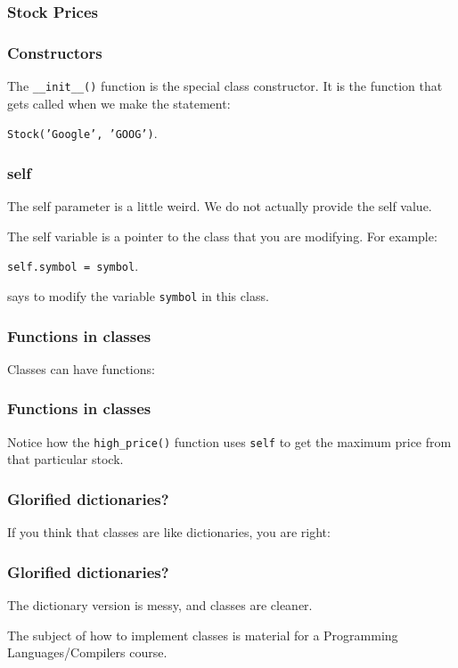 \documentclass{beamer}
\begin{document}
\begin{frame}
\frametitle{Stock Prices}


\end{frame}


\begin{frame}
\frametitle{Constructors}

The \texttt{\_\_init\_\_()} function is the special class constructor.  It is the function that gets called when we make the statement:

\begin{center}
\texttt{Stock('Google', 'GOOG')}.
\end{center}

\end{frame}

\begin{frame}
\frametitle{self}
The self parameter is a little weird.  We do not actually provide the self value.

\vspace{0.2in}

The self variable is a pointer to the class that you are modifying.  For example:

\begin{center}
\texttt{self.symbol = symbol}.
\end{center}

says to modify the variable \texttt{symbol} in this class.

\end{frame}

\begin{frame}
\frametitle{Functions in classes}
Classes can have functions:

\end{frame}


\begin{frame}
\frametitle{Functions in classes}
Notice how the \texttt{high\_price()} function uses \texttt{self} to get the maximum price from that particular stock.
\end{frame}


\begin{frame}
\frametitle{Glorified dictionaries?}
If you think that classes are like dictionaries, you are right:
\end{frame}

\begin{frame}
\frametitle{Glorified dictionaries?}
The dictionary version is messy, and classes are cleaner.

\vspace{0.2in}

The subject of how to implement classes is material for a Programming Languages/Compilers course.
\end{frame}
\end{document}
